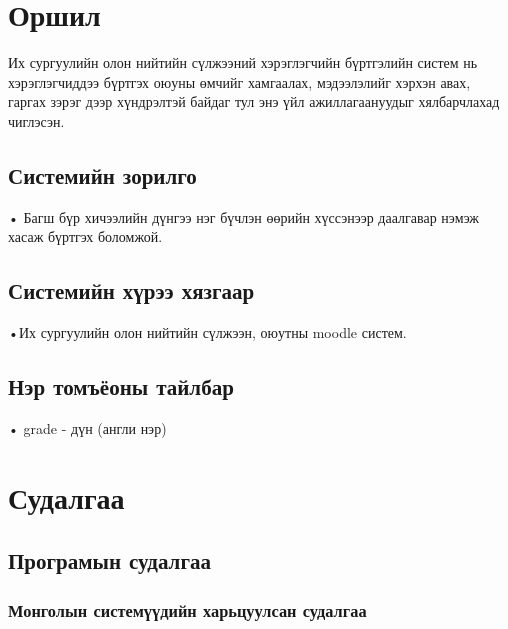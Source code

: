 \documentclass[
oneside, %
english, %
onehalfspacing, %
nolistspacing, %
headsepline, %
]{article} %
\begin{document}

	
	
    \tableofcontents
   
	\section{Оршил}
	   
	   Их сургуулийн олон нийтийн сүлжээний хэрэглэгчийн бүртгэлийн систем нь хэрэглэгчиддээ бүртгэх оюуны өмчийг хамгаалах, мэдээлэлийг хэрхэн авах, гаргах зэрэг дээр хүндрэлтэй байдаг тул энэ үйл ажиллагаануудыг хялбарчлахад чиглэсэн.
	   
	\subsection{Системийн зорилго}
	• Багш бүр хичээлийн дүнгээ нэг бүчлэн өөрийн хүссэнээр даалгавар нэмэж хасаж бүртгэх боломжой.
	\subsection{Системийн хүрээ хязгаар}
	•Их сургуулийн олон нийтийн сүлжээн, оюутны moodle систем.
	\subsection{Нэр томъёоны тайлбар}
	• grade - дүн (англи нэр)
	\section{Судалгаа}
	\subsection{Програмын судалгаа}
	\subsubsection{Монголын  системүүдийн харьцуулсан судалгаа}
\end{document}
